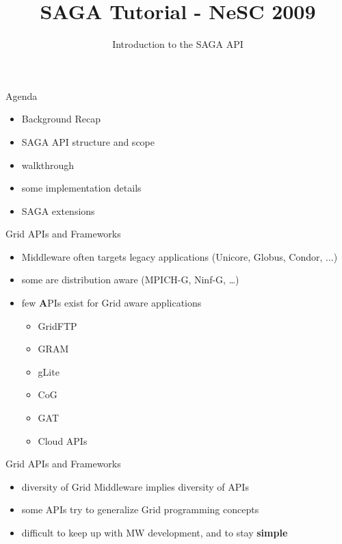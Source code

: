 \documentclass[%
  pdf,
  colorBG,
  slideColor,
  frames,
  ogf
]{prosper}
\title{\flushleft SAGA Tutorial - NeSC 2009}
\author{\LARGE \white Introduction to the SAGA API}
\newcommand{\B}[1]{\textbf{#1}}
\newcommand{\dn}{\vspace*{+1em}}
\begin{document}
 \slidetitlepage

 \begin{slide}{Agenda}

  \dn

  \begin{itemize}
   \item Background Recap
   \item SAGA API structure and scope
   \item walkthrough
   \item some implementation details
   \item SAGA extensions
  \end{itemize}

 \end{slide}


 \begin{slide}{Grid APIs and Frameworks}

 \dn

  \begin{itemize}
   \item Middleware often targets legacy applications (Unicore, Globus, Condor, ...)
   \item some are distribution aware (MPICH-G, Ninf-G, \dots)
   \item few \B{A}PIs exist for Grid aware applications
    \begin{itemize}
     \item GridFTP
     \item GRAM
     \item gLite
     \item CoG
     \item GAT
     \item Cloud APIs
    \end{itemize}
  \end{itemize}

 \end{slide}


 \begin{slide}{Grid APIs and Frameworks}
 \dn
  \begin{itemize}
   \item diversity of Grid Middleware implies diversity of APIs
   \item some APIs try to generalize Grid programming concepts
   \item difficult to keep up with MW development, and to stay \B{simple}
  \end{itemize}
 \end{slide}
\end{document}
